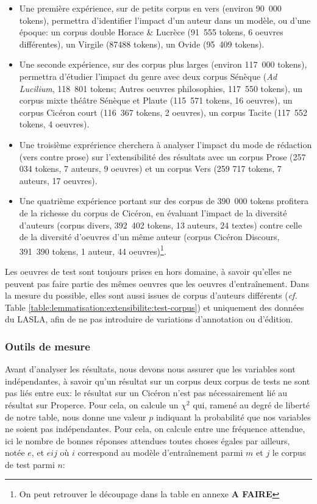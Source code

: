 \begin{itemize}
    \item Une première expérience, sur de petits corpus en vers (environ 90~000 tokens), permettra d'identifier l'impact d'un auteur dans un modèle, ou d'une époque: un corpus double Horace \& Lucrèce (91~555 tokens, 6 oeuvres différentes), un Virgile (87488 tokens), un Ovide (95~409 tokens).
    \item Une seconde expérience, sur des corpus plus larges (environ 117~000 tokens), permettra d'étudier l'impact du genre avec deux corpus Sénèque (\textit{Ad Lucilium}, 118~801 tokens; Autres oeuvres philosophies, 117~550 tokens), un corpus mixte théâtre Sénèque et Plaute (115~571 tokens, 16 oeuvres), un corpus Cicéron court (116~367 tokens, 2 oeuvres), un corpus Tacite (117~552 tokens, 4 oeuvres).
    \item Une troisième exprérience cherchera à analyser l'impact du mode de rédaction (vers contre prose) sur l'extensibilité des résultats avec un corpus Prose (257 034 tokens, 7 auteurs, 9 oeuvres) et un corpus Vers (259 717 tokens, 7 auteurs, 17 oeuvres).
    \item Une quatrième expérience portant sur des corpus de 390~000 tokens profitera de la richesse du corpus de Cicéron, en évaluant l'impact de la diversité d'auteurs (corpus divers, 392~402 tokens, 13 auteurs, 24 textes) contre celle de la diversité d'oeuvres d'un même auteur (corpus Cicéron Discours, 391~390 tokens, 1 auteur, 44 oeuvres)\footnote{On peut retrouver le découpage dans la table en annexe \textbf{A FAIRE}}.
\end{itemize}{}

Les oeuvres de test sont toujours prises en hors domaine, à savoir qu'elles ne peuvent pas faire partie des mêmes oeuvres que les oeuvres d'entraînement. Dans la mesure du possible, elles sont aussi issues de corpus d'auteurs différents (\textit{cf.} Table \ref{table:lemmatisation:extensibilite:test-corpus}) et uniquement des données du LASLA, afin de ne pas introduire de variations d'annotation ou d'édition.

\subsubsection{Outils de mesure}

Avant d'analyser les résultats, nous devons nous assurer que les variables sont indépendantes, à savoir qu'un résultat sur un corpus deux corpus de tests ne sont pas liés entre eux: le résultat sur un Cicéron n'est pas nécessairement lié au résultat sur Properce. Pour cela, on calcule un $\chi^{2}$ qui, ramené au degré de liberté de notre table, nous donne une valeur $p$ indiquant la probabilité que nos variables ne soient pas indépendantes. Pour cela, on calcule entre une fréquence attendue, ici le nombre de bonnes réponses attendues toutes choses égales par ailleurs, notée $e$, et $e{ij}$ où $i$ correspond au modèle d'entraînement parmi $m$  et $j$ le corpus de test parmi $n$:

